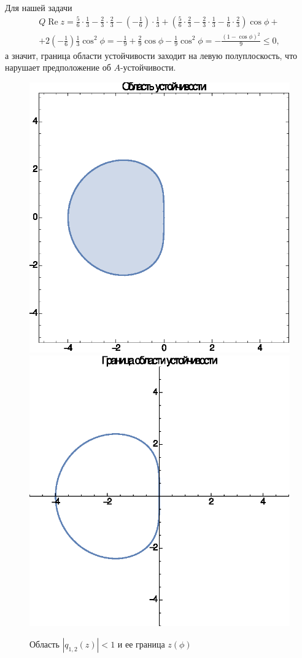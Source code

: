 \documentclass[12pt]{article}
\begin{document}
Для нашей задачи
\begin{multline*}
Q \operatorname{Re} z = \frac{5}{6}\cdot\frac{1}{3} - \frac{2}{3}\cdot\frac{2}{3} - \left(-\frac{1}{6}\right)\cdot\frac{1}{3} + 
\left(\frac{5}{6}\cdot\frac{2}{3} - \frac{2}{3} \cdot \frac{1}{3} - \frac{1}{6}\cdot\frac{2}{3}\right)\cos \phi + \\ +
2 \left(-\frac{1}{6}\right) \frac{1}{3} \cos^2 \phi = -\frac{1}{9} + \frac{2}{9}\cos \phi - \frac{1}{9}\cos^2 \phi = -\frac{(1 - \cos \phi)^2}{9} \leqslant 0,
\end{multline*}
а значит, граница области устойчивости заходит на левую полуплоскость, что нарушает предположение об $A$-устойчивости.

\begin{figure}
\centering
\includegraphics[width=.45\textwidth]{test_gr1.eps}\quad%
\includegraphics[width=.45\textwidth]{test_gr2.eps}
\caption{Область $|q_{1,2}(z)| < 1$ и ее граница $z(\phi)$} 
\end{figure}
\end{document}
